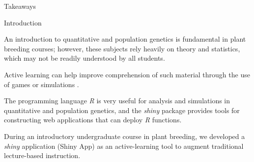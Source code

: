 \documentclass[final]{beamer}
\newlength{\onecolwid}
\begin{document}
\begin{frame}[t]
\begin{columns}[t]
\begin{column}{\onecolwid}
\begin{alertblock}{\Large{Takeaways}}
\end{alertblock}


\begin{block}{Introduction}


An introduction to quantitative and population genetics is fundamental in plant breeding courses; however, these subjects rely heavily on theory and statistics, which may not be readily understood by all students.

\vspace{1cm}

Active learning can help improve comprehension of such material \cite{Freeman2014} through the use of games or simulations \cite{Bernardo2017a, McKeachie2006}.

\vspace{1cm}

The programming language \textit{R} is very useful for analysis and simulations in quantitative and population genetics, and the \textit{shiny} \cite{Chang2017} package provides tools for constructing web applications that can deploy \textit{R} functions.

\vspace{1cm}

During an introductory undergraduate course in plant breeding, we developed a \textit{shiny} application (Shiny App) as an active-learning tool to augment traditional lecture-based instruction.

\end{block}


%
%
%
%
%
%
%
%





\end{column}
\end{columns}
\end{frame}
\end{document}
